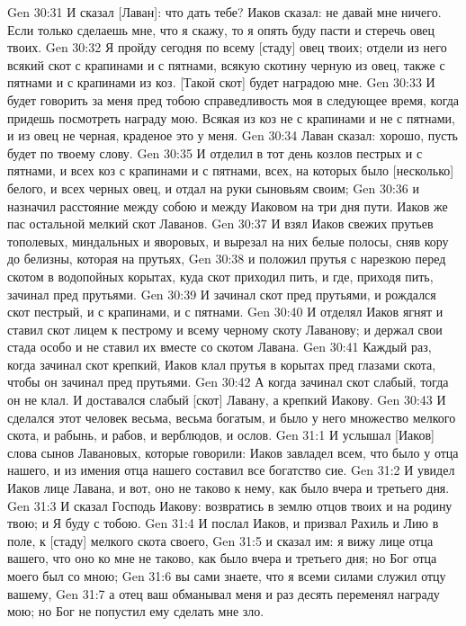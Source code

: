Gen 30:31  И сказал [Лаван]: что дать тебе? Иаков сказал: не давай мне ничего. Если только сделаешь мне, что я скажу, то я опять буду пасти и стеречь овец твоих.
Gen 30:32  Я пройду сегодня по всему [стаду] овец твоих; отдели из него всякий скот с крапинами и с пятнами, всякую скотину черную из овец, также с пятнами и с крапинами из коз. [Такой скот] будет наградою мне.
Gen 30:33  И будет говорить за меня пред тобою справедливость моя в следующее время, когда придешь посмотреть награду мою. Всякая из коз не с крапинами и не с пятнами, и из овец не черная, краденое это у меня.
Gen 30:34  Лаван сказал: хорошо, пусть будет по твоему слову.
Gen 30:35  И отделил в тот день козлов пестрых и с пятнами, и всех коз с крапинами и с пятнами, всех, на которых было [несколько] белого, и всех черных овец, и отдал на руки сыновьям своим;
Gen 30:36  и назначил расстояние между собою и между Иаковом на три дня пути. Иаков же пас остальной мелкий скот Лаванов.
Gen 30:37  И взял Иаков свежих прутьев тополевых, миндальных и яворовых, и вырезал на них белые полосы, сняв кору до белизны, которая на прутьях,
Gen 30:38  и положил прутья с нарезкою перед скотом в водопойных корытах, куда скот приходил пить, и где, приходя пить, зачинал пред прутьями.
Gen 30:39  И зачинал скот пред прутьями, и рождался скот пестрый, и с крапинами, и с пятнами.
Gen 30:40  И отделял Иаков ягнят и ставил скот лицем к пестрому и всему черному скоту Лаванову; и держал свои стада особо и не ставил их вместе со скотом Лавана.
Gen 30:41  Каждый раз, когда зачинал скот крепкий, Иаков клал прутья в корытах пред глазами скота, чтобы он зачинал пред прутьями.
Gen 30:42  А когда зачинал скот слабый, тогда он не клал. И доставался слабый [скот] Лавану, а крепкий Иакову.
Gen 30:43  И сделался этот человек весьма, весьма богатым, и было у него множество мелкого скота, и рабынь, и рабов, и верблюдов, и ослов.
Gen 31:1  И услышал [Иаков] слова сынов Лавановых, которые говорили: Иаков завладел всем, что было у отца нашего, и из имения отца нашего составил все богатство сие.
Gen 31:2  И увидел Иаков лице Лавана, и вот, оно не таково к нему, как было вчера и третьего дня.
Gen 31:3  И сказал Господь Иакову: возвратись в землю отцов твоих и на родину твою; и Я буду с тобою.
Gen 31:4  И послал Иаков, и призвал Рахиль и Лию в поле, к [стаду] мелкого скота своего,
Gen 31:5  и сказал им: я вижу лице отца вашего, что оно ко мне не таково, как было вчера и третьего дня; но Бог отца моего был со мною;
Gen 31:6  вы сами знаете, что я всеми силами служил отцу вашему,
Gen 31:7  а отец ваш обманывал меня и раз десять переменял награду мою; но Бог не попустил ему сделать мне зло.
